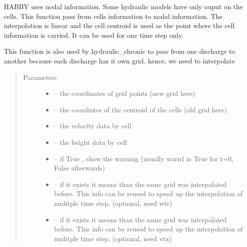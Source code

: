 \documentclass[letterpaper,10pt,english]{sphinxmanual}
\begin{document}
\begin{fulllineitems}
\label{\detokenize{index:src.manage_grid_8.pass_grid_cell_to_node_lin}}
HABBY uses nodal information. Some hydraulic models have only ouput on the cells. This function pass
from cells information to nodal information. The interpolation is linear and the cell centroid is used as the
point where the cell information is carried. It can be used for one time step only.

This function is also used by hydraulic\_chronic to pass from one discharge to another because each discharge
has it own grid. hence, we need to interpolate
\begin{quote}\begin{description}
\item[{Parameters}] \leavevmode\begin{itemize}
\item {} 
 -- the coordinates of grid points (new grid here)

\item {} 
 -- the coordintes of the centroid of the cells (old grid here)

\item {} 
 -- the velocity data by cell

\item {} 
 -- the height data by cell

\item {} 
 -- if True , show the warning (usually warn1 is True for t=0, False afterwards)

\item {} 
 -- if it exists it means than the same grid was interpolated before. This info can be reused to
speed up the interpolation of mulitple time step. (optional, need wts)

\item {} 
 -- if it exists it means than the same grid was interpolated before. This info can be reused to
speed up the interpolation of mulitple time step. (optional, need vtx)

\end{itemize}


\end{description}
\end{quote}
\end{fulllineitems}
\end{document}
